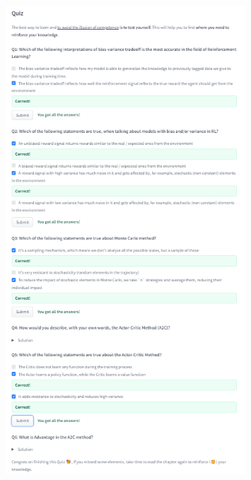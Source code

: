 \begin{homeworkProblem}
\begin{figure}[H]
\end{figure}
\begin{figure}[H]
    \centering
    \includegraphics[width=0.8\textwidth]{../Img/Huggingface_DRL/unit6_quiz.png}
\end{figure}

\end{homeworkProblem}

\newpage